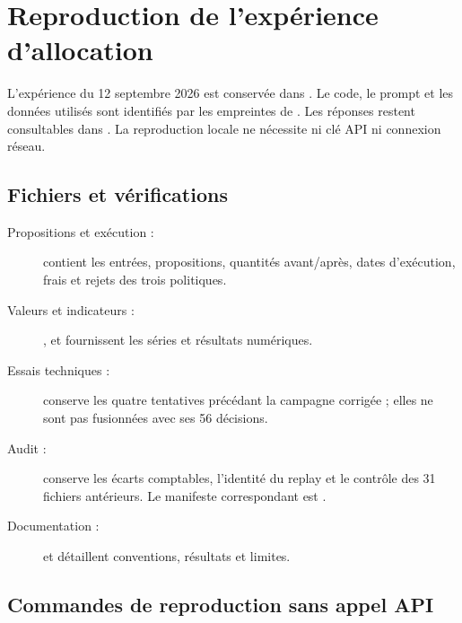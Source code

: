 \chapter{Reproduction de l'expérience d'allocation}\label{ann:allocation}

L'expérience du 12 septembre 2026 est conservée dans . Le code, le prompt et les données utilisés sont identifiés par les empreintes de . Les réponses restent consultables dans . La reproduction locale ne nécessite ni clé API ni connexion réseau.

\section{Fichiers et vérifications}

\begin{description}
\item[Propositions et exécution :]  contient les entrées, propositions, quantités avant/après, dates d'exécution, frais et rejets des trois politiques.
\item[Valeurs et indicateurs :] ,  et  fournissent les séries et résultats numériques.
\item[Essais techniques :]  conserve les quatre tentatives précédant la campagne corrigée ; elles ne sont pas fusionnées avec ses 56 décisions.
\item[Audit :]  conserve les écarts comptables, l'identité du replay et le contrôle des 31 fichiers antérieurs. Le manifeste correspondant est .
\item[Documentation :]  et  détaillent conventions, résultats et limites.
\end{description}

\section{Commandes de reproduction sans appel API}

